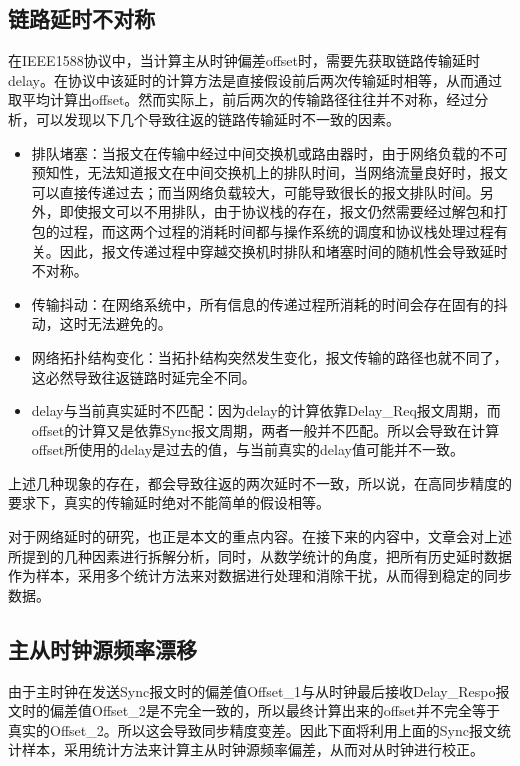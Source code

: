 \subsection{链路延时不对称}
\label{sec:1588_problem_1}
在IEEE1588协议中，当计算主从时钟偏差offset时，需要先获取链路传输延时delay。在协议中该延时的计算方法是直接假设前后两次传输延时相等，从而通过取平均计算出offset。然而实际上，前后两次的传输路径往往并不对称，经过分析，可以发现以下几个导致往返的链路传输延时不一致的因素\supercite{55}。
\begin{itemize}[noitemsep,topsep=0pt,parsep=0pt,partopsep=0pt]
	\item 排队堵塞：当报文在传输中经过中间交换机或路由器时，由于网络负载的不可预知性，无法知道报文在中间交换机上的排队时间，当网络流量良好时，报文可以直接传递过去；而当网络负载较大，可能导致很长的报文排队时间。另外，即使报文可以不用排队，由于协议栈的存在，报文仍然需要经过解包和打包的过程，而这两个过程的消耗时间都与操作系统的调度和协议栈处理过程有关。因此，报文传递过程中穿越交换机时排队和堵塞时间的随机性会导致延时不对称\supercite{46}。
	\item 传输抖动：在网络系统中，所有信息的传递过程所消耗的时间会存在固有的抖动，这时无法避免的。
	\item 网络拓扑结构变化：当拓扑结构突然发生变化，报文传输的路径也就不同了，这必然导致往返链路时延完全不同。
	\item delay与当前真实延时不匹配：因为delay的计算依靠Delay\_Req报文周期，而offset的计算又是依靠Sync报文周期，两者一般并不匹配。所以会导致在计算offset所使用的delay是过去的值，与当前真实的delay值可能并不一致。
\end{itemize}

上述几种现象的存在，都会导致往返的两次延时不一致，所以说，在高同步精度的要求下，真实的传输延时绝对不能简单的假设相等。

对于网络延时的研究，也正是本文的重点内容。在接下来的内容中，文章会对上述所提到的几种因素进行拆解分析，同时，从数学统计的角度，把所有历史延时数据作为样本，采用多个统计方法来对数据进行处理和消除干扰，从而得到稳定的同步数据。

\subsection{主从时钟源频率漂移}
由于主时钟在发送Sync报文时的偏差值Offset\_1与从时钟最后接收Delay\_Respo报文时的偏差值Offset\_2是不完全一致的，所以最终计算出来的offset并不完全等于真实的Offset\_2。所以这会导致同步精度变差。因此下面将利用上面的Sync报文统计样本，采用统计方法来计算主从时钟源频率偏差，从而对从时钟进行校正。


